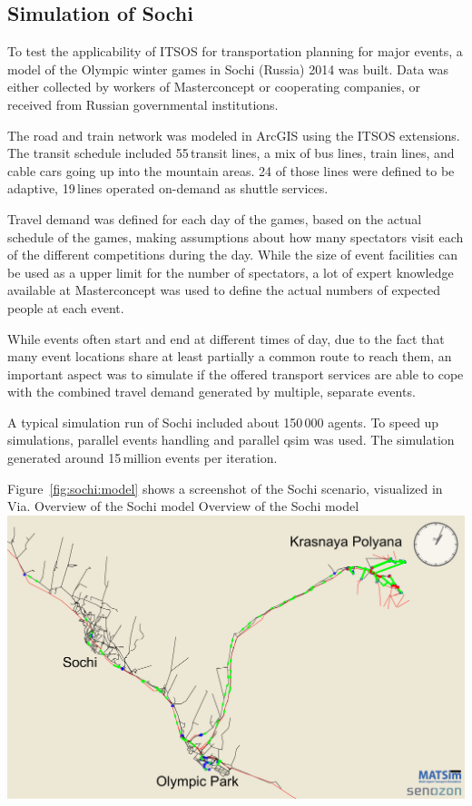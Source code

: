 \subsection{Simulation of Sochi}
To test the applicability of ITSOS for transportation planning for major events,
a model of the Olympic winter games in Sochi (Russia) 2014 was built. Data was
either collected by workers of Masterconcept or cooperating companies, or
received from Russian governmental institutions.

The road and train network was modeled in ArcGIS using the ITSOS extensions.
The transit schedule included 55\,transit lines, a mix of bus lines, train lines,
and cable cars going up into the mountain areas. 24 of those lines were
defined to be adaptive, 19\,lines operated on-demand as shuttle services.

Travel demand was defined for each day of the games, based on the actual schedule of the games,
making assumptions about how many spectators visit each of the different
competitions during the day. While the size of event facilities can be used as a
upper limit for the number of spectators, a lot of expert knowledge available at
Masterconcept was used to define the actual numbers of expected people at each
event.

While events often start and end at different times of day, due to the fact that many event locations share at least partially a
common route to reach them, an important aspect was to simulate if the offered transport services are able to cope with the combined travel demand generated by multiple, separate events.

A typical simulation run of Sochi included about 150\,000 agents. To speed up simulations, parallel events handling and parallel qsim was used. The simulation generated around 15\,million events per iteration.

Figure~\ref{fig:sochi:model} shows a screenshot of the Sochi scenario, visualized in Via.
%
\createfigure%
{Overview of the Sochi model}%
{Overview of the Sochi model}%
{\label{fig:sochi:model}}%
{\includegraphics[width=1.\textwidth,angle=0]{./using/figures/sochi_full.pdf}}%
{}
%

